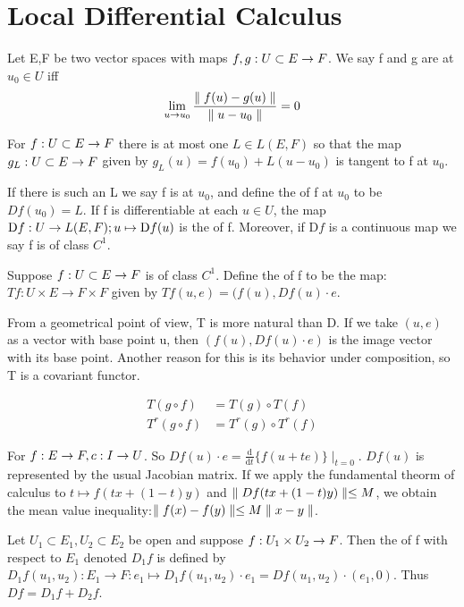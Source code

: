 \section{Local Differential Calculus}
\begin{definition}
Let E,F be two vector spaces with maps ${f,g}:{U\subset E}\rightarrow{F}$. We say f and g are  at $u_0\in U$ iff
$$ \lim_{u\rightarrow u_0}\frac{\parallel{f(u)-g(u)}\parallel}{\parallel{u-u_0}\parallel}=0$$
\end{definition}
\begin{thm}
For ${f}:{U\subset E}\rightarrow{F}$ there is at most one $L\in L(E,F)$ so that the map ${g_L}:{U\subset E}\rightarrow{F}$ given by
$g_L(u)=f(u_0)+L(u-u_0)$ is tangent to f at $u_0$.
\end{thm}
\begin{definition}
If there is such an L we say f is  at $u_0$, and define the  of f at $u_0$ to be
$Df(u_0)=L$. If f is differentiable at each $u\in U$, the map ${\mathrm{D}f}:{U}\rightarrow{L(E,F)};u\mapsto \mathrm{D}f(u)$ 
is the  of f. Moreover, if $\mathrm{D}f$ is a continuous map we say f is of class $C^1$.
\end{definition}
\begin{definition}
Suppose ${f}:{U\subset E}\rightarrow{F}$ is of class $C^1$. Define the  of f to be the map: $Tf:U\times E\rightarrow
F\times F$ given by $Tf(u,e)=(f(u),Df(u)\cdot e$.
\end{definition}
From a geometrical point of view, T is more natural than D. If we take $(u,e)$ as a vector with base point u, then $(f(u),
Df(u)\cdot e)$ is the image vector with its base point. Another reason for this is its behavior under composition, so T is
a covariant functor.
\begin{thm}
\begin{align*}
T(g\circ f)&=T(g)\circ T(f) \\
T^r(g\circ f)&=T^r(g)\circ T^r(f)
\end{align*}
\end{thm}
For ${f}:{E}\rightarrow{F},{c}:{I}\rightarrow{U}$. So $Df(u)\cdot e=\frac{\text{d}}{\text{d}t}\lbrace f(u+te)\rbrace\mid_{t=0}$. $Df(u)$ is
represented by the usual Jacobian matrix. If we apply the fundamental theorm of calculus to $t\mapsto f(tx+(1-t)y)$ and 
$\parallel{Df(tx+(1-t)y)}\parallel\leq M$, we obtain the mean value inequality:$\parallel{f(x)-f(y)}\parallel\leq M\parallel{x-y}\parallel$.
\begin{definition}
Let $U_1\subset E_1, U_2\subset E_2$ be open and suppose ${f}:{U_1\times U_2}\rightarrow{F}$. Then the  of f
with respect to $E_1$ denoted $D_1f$ is defined by $D_1f(u_1,u_2):E_1\rightarrow F: e_1\mapsto D_1f(u_1,u_2)\cdot e_1 = 
Df(u_1,u_2)\cdot (e_1,0)$. Thus $Df=D_1f+D_2f$.
\end{definition}
